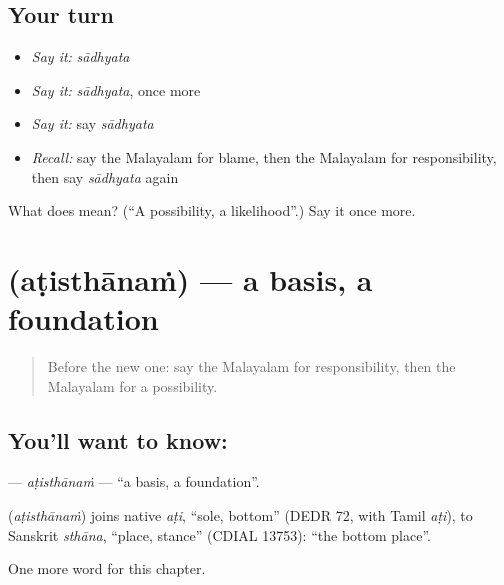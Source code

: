 \subsection*{Your turn}
\begin{itemize}
\raggedright
  \item \emph{Say it:} \emph{sādhyata}
  \item \emph{Say it:} \emph{sādhyata}, once more
  \item \emph{Say it:} say \emph{sādhyata}
  \item \emph{Recall:} say the Malayalam for blame, then the Malayalam for responsibility, then say \emph{sādhyata} again
\end{itemize}

\begin{tcolorbox}[breakable,colback=teal!4,colframe=teal!35!black,title={Before you move on}]
What does  mean? (\textquotedblleft{}A possibility, a likelihood\textquotedblright{}.) Say it once more.
\end{tcolorbox}
\section[\texorpdfstring{\ml{അടിസ്ഥാനം} (aṭisthānaṁ)}{അടിസ്ഥാനം (aṭisthānaṁ)}]{ (aṭisthānaṁ) — a basis, a foundation}

\label{lesson:ML-C243-atisthanam}



\begin{quote}
Before the new one: say the Malayalam for responsibility, then the Malayalam for a possibility.
\end{quote}

\subsection*{You'll want to know: }
\textbf{} — \emph{aṭisthānaṁ} — \textquotedblleft{}a basis, a foundation\textquotedblright{}.

\begin{cousinweb}
\textbf{} (\emph{aṭisthānaṁ}) joins native \emph{aṭi}, \textquotedblleft{}sole, bottom\textquotedblright{} (DEDR 72, with Tamil \emph{aṭi}), to Sanskrit \emph{sthāna}, \textquotedblleft{}place, stance\textquotedblright{} (CDIAL 13753): \textquotedblleft{}the bottom place\textquotedblright{}.
\end{cousinweb}

\begin{grammarlens}[title={What you've built}]
One more word for this chapter.
\end{grammarlens}

